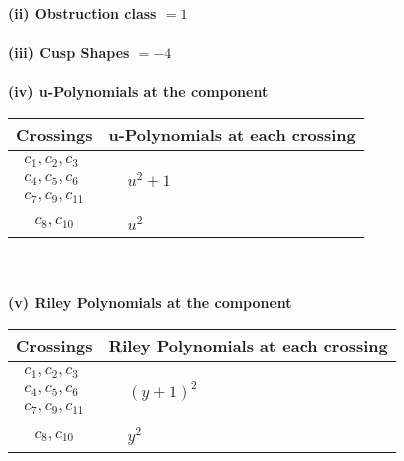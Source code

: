 \documentclass[1p]{elsarticle_modified}
\theoremstyle{definition}
\begin{document}
\flushleft \textbf{(ii) Obstruction class $= 1$}\\~\\
\flushleft \textbf{(iii) Cusp Shapes $= -4$}\\~\\
\newpage\renewcommand{\arraystretch}{1}
\flushleft \textbf{(iv) u-Polynomials at the component}\newline \\
\begin{tabular}{m{50pt}|m{274pt}}
Crossings & \hspace{64pt}u-Polynomials at each crossing \\
\hline $$\begin{aligned}c_{1},c_{2},c_{3}\\c_{4},c_{5},c_{6}\\c_{7},c_{9},c_{11}\end{aligned}$$&$\begin{aligned}
&u^2+1
\end{aligned}$\\
\hline $$\begin{aligned}c_{8},c_{10}\end{aligned}$$&$\begin{aligned}
&u^2
\end{aligned}$\\
\hline
\end{tabular}\\~\\
\newpage\renewcommand{\arraystretch}{1}
\flushleft \textbf{(v) Riley Polynomials at the component}\newline \\
\begin{tabular}{m{50pt}|m{274pt}}
Crossings & \hspace{64pt}Riley Polynomials at each crossing \\
\hline $$\begin{aligned}c_{1},c_{2},c_{3}\\c_{4},c_{5},c_{6}\\c_{7},c_{9},c_{11}\end{aligned}$$&$\begin{aligned}
&(y+1)^2
\end{aligned}$\\
\hline $$\begin{aligned}c_{8},c_{10}\end{aligned}$$&$\begin{aligned}
&y^2
\end{aligned}$\\
\hline
\end{tabular}\\~\\
\end{document}
